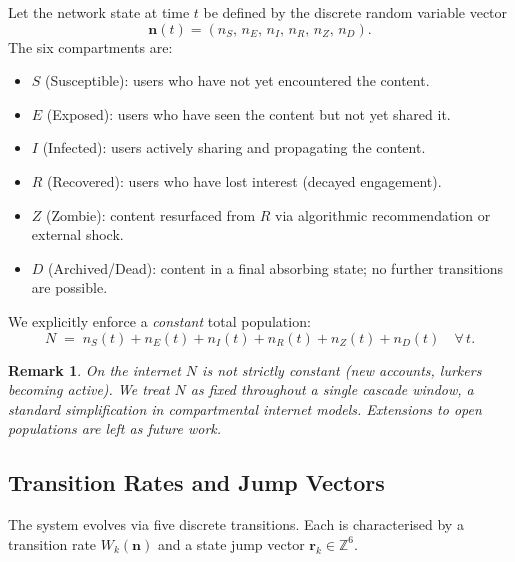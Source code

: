 \documentclass[11pt]{article}
\newtheorem{remark}{Remark}
\newcommand{\bn}{\mathbf{n}}
\newcommand{\br}{\mathbf{r}}
\begin{document}
Let the network state at time $t$ be defined by the discrete random variable
vector
\[
  \bn(t) = (n_S,\, n_E,\, n_I,\, n_R,\, n_Z,\, n_D).
\]
The six compartments are:
\begin{itemize}[noitemsep]
  \item $S$ (Susceptible): users who have not yet encountered the content.
  \item $E$ (Exposed): users who have seen the content but not yet shared it.
  \item $I$ (Infected): users actively sharing and propagating the content.
  \item $R$ (Recovered): users who have lost interest (decayed engagement).
  \item $Z$ (Zombie): content resurfaced from $R$ via algorithmic recommendation
        or external shock.
  \item $D$ (Archived/Dead): content in a final absorbing state; no further
        transitions are possible.
\end{itemize}
We explicitly enforce a \emph{constant} total population:
\begin{equation}
  N \;=\; n_S(t) + n_E(t) + n_I(t) + n_R(t) + n_Z(t) + n_D(t)
  \quad \forall\, t.
  \label{eq:conservation}
\end{equation}

\begin{remark}
On the internet $N$ is not strictly constant (new accounts, lurkers becoming
active). We treat $N$ as fixed throughout a single cascade window, a standard
simplification in compartmental internet models. Extensions to open populations
are left as future work.
\end{remark}

\subsection{Transition Rates and Jump Vectors}
\label{sec:transitions}

The system evolves via five discrete transitions. Each is characterised by a
transition rate $W_k(\bn)$ and a state jump vector $\br_k \in \mathbb{Z}^6$.
\end{document}
